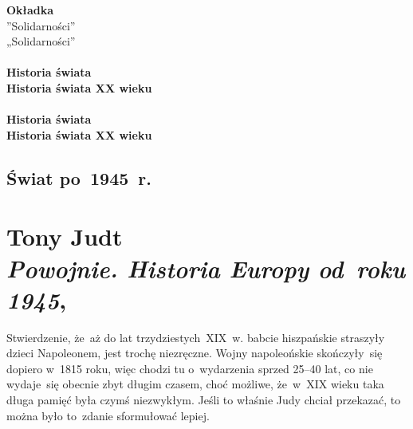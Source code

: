 \documentclass[a4paper,11pt]{article}
\numberwithin{equation}{section}
\begin{document}
\VerSpaceFour


\noindent
\textbf{Okładka} \\
\Jest ”Solidarności” \\
\PowinnoByc „Solidarności” \\
 \\
\Jest \textbf{Historia świata} \\
\PowinnoByc \textbf{Historia świata XX wieku} \\
 \\
\Jest \textbf{Historia świata} \\
\PowinnoByc \textbf{Historia świata XX wieku} \\












\newpage

\subsection{Świat po~1945~r.}

\VerSpaceTwo


\section{Tony Judt \\
  \textit{Powojnie. Historia Europy od~roku 1945},
  \cite{JudtPowojnie2016}}

\vspace{0em}



\vspace{0em}


\noindent
{} Stwierdzenie, że~aż do lat trzydziestych~XIX~w. babcie hiszpańskie
straszyły dzieci Napoleonem, jest trochę niezręczne. Wojny napoleońskie
skończyły~się dopiero w~1815 roku, więc chodzi tu o~wydarzenia sprzed
25--40 lat, co nie wydaje~się obecnie zbyt długim czasem, choć możliwe,
że~w~XIX wieku taka długa pamięć była czymś niezwykłym. Jeśli to właśnie
Judy chciał przekazać, to można było to~zdanie sformułować lepiej.

\VerSpaceFour
\end{document}
